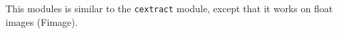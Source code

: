 This modules is similar to the \verb+cextract+ module, except that it
works on float images (Fimage).
